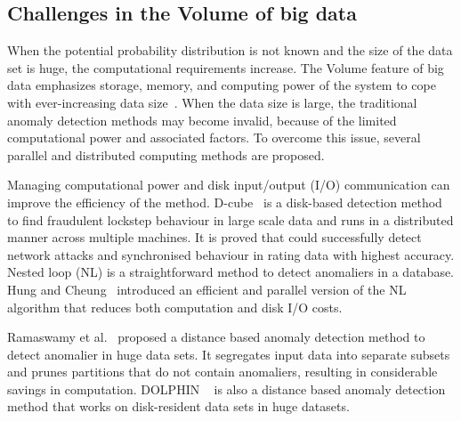 \subsection{Challenges in the Volume of big data}

When the potential probability distribution is not
known and the size of the data set is huge,
the computational requirements increase.
The Volume feature of big data emphasizes storage,
memory,
and computing power of the system to
cope with ever-increasing data size~\cite{gadepally2014big}.
When the data size is large,
the traditional anomaly detection methods may become invalid,
because of the limited computational power and associated factors.
To overcome this issue,
several parallel and distributed computing methods are proposed.

Managing computational power and disk input/output (I/O) communication can
improve the efficiency of the method.
D-cube~\cite{shin2017d} is a disk-based detection method to
find fraudulent lockstep behaviour in large scale data and
runs in a distributed manner across multiple machines.
It is proved that could successfully
detect network attacks and
synchronised behaviour in rating data
with highest accuracy.
Nested loop (NL)\cite{knox1998algorithms} is
a straightforward method to detect anomaliers in a database.
Hung and Cheung~\cite{hung2002parallel} introduced an
efficient and parallel version
of the NL algorithm that reduces both computation and disk I/O costs.

Ramaswamy et al.~\cite{ramaswamy2000efficient} proposed a
distance based  anomaly detection method to detect anomalier in huge data sets.
It segregates input data into
separate subsets and prunes partitions that
do not contain anomaliers,
resulting in considerable
savings in computation.
DOLPHIN ~\cite{angiulli2007very} is also a
distance based anomaly detection method
that works on disk-resident data sets in huge datasets.

